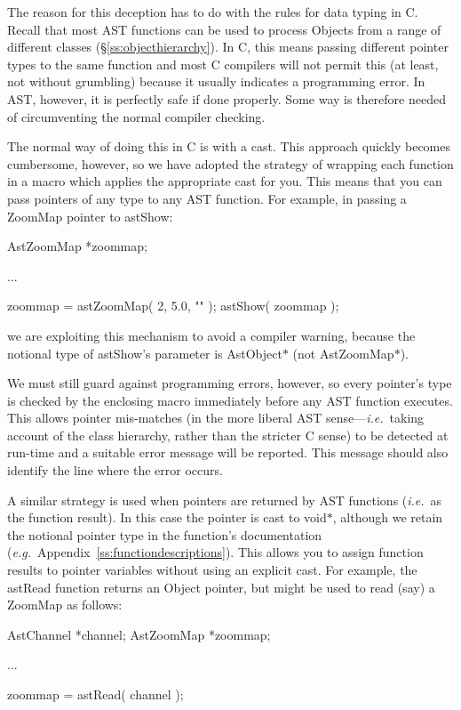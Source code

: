 \documentclass[twoside,11pt]{starlink}
\providecommand{\appref}[1]{Appendix~\ref{#1}}
\providecommand{\secref}[1]{\S\ref{#1}}
\begin{document}
The reason for this deception has to do with the rules for data typing
in C. Recall that most AST functions can be used to process Objects
from a range of different classes (\secref{ss:objecthierarchy}). In C,
this means passing different pointer types to the same function and
most C compilers will not permit this (at least, not without
grumbling) because it usually indicates a programming error. In AST,
however, it is perfectly safe if done properly. Some way is therefore
needed of circumventing the normal compiler checking.

The normal way of doing this in C is with a cast. This approach
quickly becomes cumbersome, however, so we have adopted the strategy
of wrapping each function in a macro which applies the appropriate
cast for you. This means that you can pass pointers of any type to any
AST function. For example, in passing a ZoomMap pointer to astShow:

\small
\begin{terminalv}
AstZoomMap *zoommap;

...

zoommap = astZoomMap( 2, 5.0, "" );
astShow( zoommap );
\end{terminalv}
\normalsize

we are exploiting this mechanism to avoid a compiler warning, because
the notional type of astShow's parameter is AstObject$*$ (not
AstZoomMap$*$).

We must still guard against programming errors, however, so every
pointer's type is checked by the enclosing macro immediately before
any AST function executes. This allows pointer mis-matches (in the
more liberal AST sense---\emph{i.e.}\ taking account of the class
hierarchy, rather than the stricter C sense) to be detected at
run-time and a suitable error message will be reported. This message
should also identify the line where the error occurs.

A similar strategy is used when pointers are returned by AST functions
(\emph{i.e.}\ as the function result). In this case the pointer is
cast to void$*$, although we retain the notional pointer type in the
function's documentation
(\emph{e.g.}\ \appref{ss:functiondescriptions}). This allows you to
assign function results to pointer variables without using an explicit
cast. For example, the astRead function returns an Object pointer, but
might be used to read (say) a ZoomMap as follows:

\small
\begin{terminalv}
AstChannel *channel;
AstZoomMap *zoommap;

...

zoommap = astRead( channel );
\end{terminalv}
\normalsize
\end{document}

